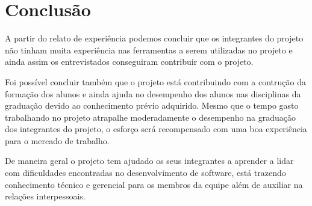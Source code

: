 \section{Conclusão}
\label{sec:conclusao}

A partir do relato de experiência podemos concluir que os integrantes do projeto não tinham muita experiência nas ferramentas a serem utilizadas no projeto e ainda assim os entrevistados conseguiram contribuir com o projeto.

Foi possível concluir também que o projeto está contribuindo com a contrução da formação dos alunos e ainda ajuda no desempenho dos alunos nas disciplinas da graduação devido ao conhecimento prévio adquirido. Mesmo que o tempo gasto trabalhando no projeto atrapalhe moderadamente o desempenho na graduação dos integrantes do projeto, o esforço será recompensado com uma boa experiência para o mercado de trabalho.

De maneira geral o projeto tem ajudado os seus integrantes a aprender a lidar com dificuldades encontradas no desenvolvimento de software, está trazendo conhecimento técnico e gerencial para os membros da equipe além de auxiliar na relações interpessoais.